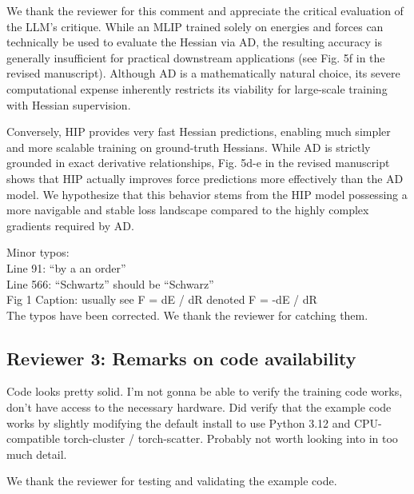 \documentclass[11pt,letterpaper]{article}
\begin{document}
{\color{responsecolour}
\noindent We thank the reviewer for this comment and appreciate the critical evaluation of the LLM's critique. While an MLIP trained solely on energies and forces can technically be used to evaluate the Hessian via AD, the resulting accuracy is generally insufficient for practical downstream applications (see Fig. 5f in the revised manuscript). Although AD is a mathematically natural choice, its severe computational expense inherently restricts its viability for large-scale training with Hessian supervision.

Conversely, HIP provides very fast Hessian predictions, enabling much simpler and more scalable training on ground-truth Hessians. While AD is strictly grounded in exact derivative relationships, Fig. 5d-e in the revised manuscript shows that HIP actually improves force predictions more effectively than the AD model. We hypothesize that this behavior stems from the HIP model possessing a more navigable and stable loss landscape compared to the highly complex gradients required by AD.
}
\vspace{1mm}

\noindent Minor typos:\\
Line 91: “by a an order”\\
Line 566: “Schwartz” should be “Schwarz”\\
Fig 1 Caption: usually see F = dE / dR denoted F = -dE / dR\\

{\color{responsecolour}
\noindent The typos have been corrected. We thank the reviewer for catching them.
}
\vspace{1mm}

\subsection*{Reviewer 3: Remarks on code availability}

Code looks pretty solid. I'm not gonna be able to verify the training code works, don't have access to the necessary hardware. Did verify that the example code works by slightly modifying the default install to use Python 3.12 and CPU-compatible torch-cluster / torch-scatter. Probably not worth looking into in too much detail.

{\color{responsecolour}
\noindent We thank the reviewer for testing and validating the example code.
}

\end{document}
